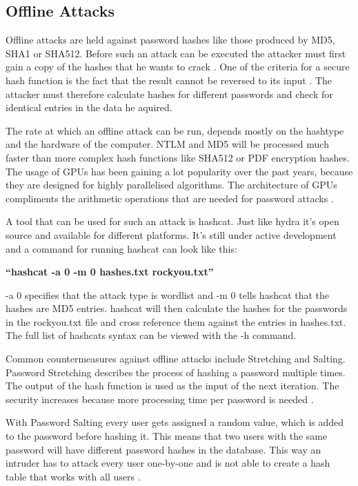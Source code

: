 \newpage

\subsection{Offline Attacks}

Offline attacks are held against password hashes like those produced by MD5, SHA1 or SHA512. Before such an attack can be executed the attacker must first gain a copy of the hashes that he wants to crack \cite{pentesting}. One of the criteria for a secure hash function is the fact that the result cannot be reversed to its input \cite{hashes}. The attacker must therefore calculate hashes for different passwords and check for identical entries in the data he aquired.

The rate at which an offline attack can be run, depends mostly on the hashtype and the hardware of the computer. NTLM and MD5 will be processed much faster than more complex hash functions like SHA512 or PDF encryption hashes. The usage of GPUs has been gaining a lot popularity over the past years, because they are designed for highly parallelised algorithms. The architecture of GPUs compliments the arithmetic operations that are needed for password attacks \cite{gpu}.

A tool that can be used for such an attack is hashcat. Just like hydra it's open source and available for different platforms. It's still under active development and a command for running hashcat can look like this:

\begin{center}
\textbf{``hashcat -a 0 -m 0 hashes.txt rockyou.txt''}
\end{center}

-a 0 specifies that the attack type is wordlist and -m 0 tells hashcat that the hashes are MD5 entries. hashcat will then calculate the hashes for the passwords in the rockyou.txt file and cross reference them against the entries in hashes.txt. The full list of hashcats syntax can be viewed with the -h command.

Common countermeasures against offline attacks include Stretching and Salting. Password Stretching describes the process of hashing a password multiple times. The output of the hash function is used as the input of the next iteration. The security increases because more processing time per password is needed \cite{anders}. 

With Password Salting every user gets assigned a random value, which is added to the password before hashing it. This means that two users with the same password will have different password hashes in the database. This way an intruder has to attack every user one-by-one and is not able to create a hash table that works with all users \cite{anders}.

\newpage